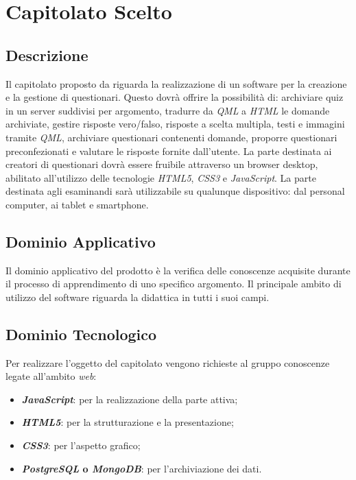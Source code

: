 \newpage
\section{Capitolato Scelto}
\subsection{Descrizione}
Il capitolato proposto da \proponente{} riguarda la realizzazione di un software per la creazione e la gestione di questionari. 
Questo dovrà offrire la possibilità di: archiviare quiz in un server suddivisi per argomento, tradurre da \textit{QML} a \textit{HTML} le domande archiviate, gestire risposte vero/falso, risposte a scelta multipla, testi e immagini tramite \textit{QML}, archiviare questionari contenenti domande, proporre questionari preconfezionati e valutare le risposte fornite dall'utente.
La parte destinata ai creatori di questionari dovrà essere fruibile attraverso un browser desktop, abilitato all'utilizzo delle tecnologie \textit{HTML5}, \textit{CSS3} e \textit{JavaScript}.
La parte destinata agli esaminandi sarà utilizzabile su qualunque dispositivo: dal personal computer, ai tablet e smartphone.

\subsection{Dominio Applicativo}
Il dominio applicativo del prodotto è la verifica delle conoscenze acquisite durante il processo di apprendimento di uno specifico argomento.
Il principale ambito di utilizzo del software riguarda la didattica in tutti i suoi campi.

\subsection{Dominio Tecnologico}
Per realizzare l'oggetto del capitolato vengono richieste al gruppo conoscenze legate all'ambito \textit{web}:
\begin{itemize}
\item \textbf{\textit{JavaScript}}: per la realizzazione della parte attiva;
\item \textbf{\textit{HTML5}}: per la strutturazione e la presentazione; 
\item \textbf{\textit{CSS3}}: per l'aspetto grafico;
\item \textbf{\textit{PostgreSQL} o \textit{MongoDB}}: per l'archiviazione dei dati.
\end{itemize}


